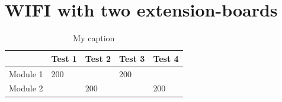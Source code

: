 \section{WIFI with two extension-boards} \label{sec:result_two_wifi_modules}
\begin{table}[]
\centering
\caption{My caption}
\label{my-label}
\begin{tabular}{@{}|l|l|l|l|l|@{}}
\toprule
         & Test 1 & Test 2 & Test 3 & Test 4 \\ \midrule
Module 1 & 200    &        & 200    &        \\ \midrule
Module 2 &        & 200    &        & 200    \\ \bottomrule
\end{tabular}
\end{table}
